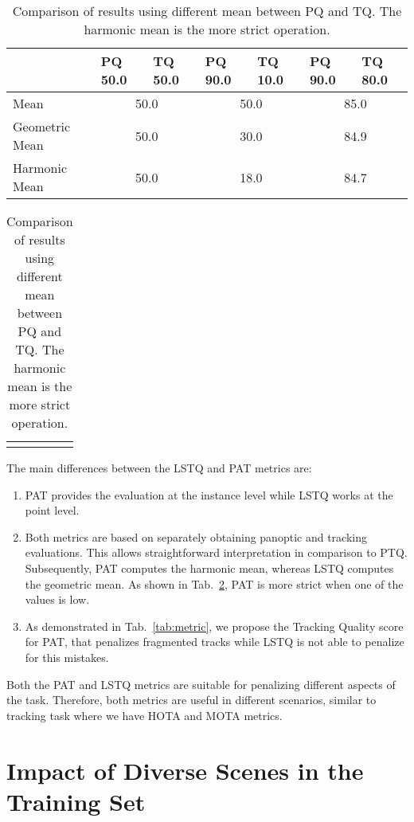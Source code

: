 \documentclass[letterpaper, 10 pt, journal, twoside]{IEEEtran}
\newcommand{\tabref}[1]{Tab.~\ref{#1}}
\begin{document}
\begin{table}
\centering
\caption{Comparison of results using different mean between PQ and TQ. The harmonic mean is the more strict operation.}
\label{tab:mean}
\footnotesize
\begin{tabular}{l|p{0.6cm}p{0.6cm}| p{0.6cm}p{0.6cm}| p{0.6cm}p{0.6cm}}
\toprule
& PQ   50.0 & TQ   50.0 & PQ   90.0 & TQ   10.0  & PQ   90.0 & TQ   80.0 \\
\bottomrule
Mean & \multicolumn{2}{c|}{50.0} & \multicolumn{2}{c|}{50.0} & \multicolumn{2}{c}{85.0} \\
Geometric Mean & \multicolumn{2}{c|}{50.0} & \multicolumn{2}{c|}{30.0} & \multicolumn{2}{c}{84.9} \\
Harmonic Mean & \multicolumn{2}{c|}{50.0} & \multicolumn{2}{c|}{18.0} & \multicolumn{2}{c}{84.7} \\
\bottomrule
\end{tabular}
\begin{tabular}{p{1cm}}
\vspace{0.2cm}\\
\end{tabular}
\end{table}

The main differences between the LSTQ and PAT metrics are:
\begin{enumerate}
    \item PAT provides the evaluation at the instance level while LSTQ works at the point level.
    \item Both metrics are based on separately obtaining panoptic and tracking evaluations. This allows straightforward interpretation in comparison to PTQ. Subsequently, PAT computes the harmonic mean, whereas LSTQ computes the geometric mean. As shown in \tabref{tab:mean}, PAT is more strict when one of the values is low.
    \item As demonstrated in \tabref{tab:metric}, we propose the Tracking Quality score for PAT, that penalizes fragmented tracks while LSTQ is not able to penalize for this mistakes.
\end{enumerate}

Both the PAT and LSTQ metrics are suitable for penalizing different aspects of the task. Therefore, both metrics are useful in different scenarios, similar to tracking task where we have HOTA and MOTA metrics.

\section{Impact of Diverse Scenes in the Training Set}
\end{document}
